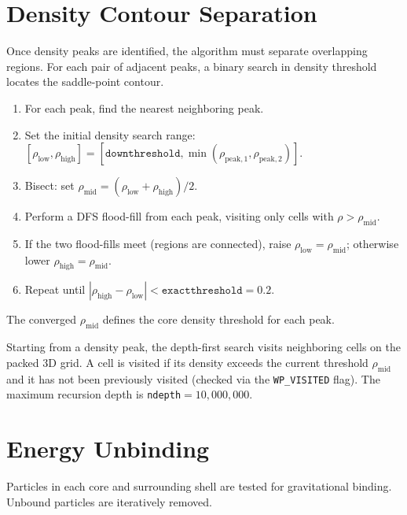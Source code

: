 \documentclass[11pt,fleqn]{book}
\newcommand{\code}[1]{\texttt{#1}}
\begin{document}
\section{Density Contour Separation}

Once density peaks are identified, the algorithm must separate overlapping regions.  For each pair of adjacent peaks, a binary search in density threshold locates the saddle-point contour.

\begin{algorithm}
\begin{enumerate}[leftmargin=2em]
  \item For each peak, find the nearest neighboring peak.
  \item Set the initial density search range: $[\rho_\text{low}, \rho_\text{high}] = [\code{downthreshold}, \min(\rho_{\text{peak},1}, \rho_{\text{peak},2})]$.
  \item Bisect: set $\rho_\text{mid} = (\rho_\text{low} + \rho_\text{high})/2$.
  \item Perform a DFS flood-fill from each peak, visiting only cells with $\rho > \rho_\text{mid}$.
  \item If the two flood-fills meet (regions are connected), raise $\rho_\text{low} = \rho_\text{mid}$; otherwise lower $\rho_\text{high} = \rho_\text{mid}$.
  \item Repeat until $|\rho_\text{high} - \rho_\text{low}| < \code{exactthreshold} = 0.2$.
\end{enumerate}
The converged $\rho_\text{mid}$ defines the core density threshold for each peak.
\end{algorithm}

\begin{definition}
Starting from a density peak, the depth-first search visits neighboring cells on the packed 3D grid.  A cell is visited if its density exceeds the current threshold $\rho_\text{mid}$ and it has not been previously visited (checked via the \code{WP\_VISITED} flag).  The maximum recursion depth is \code{ndepth}${}=10{,}000{,}000$.
\end{definition}

\section{Energy Unbinding}

Particles in each core and surrounding shell are tested for gravitational binding.  Unbound particles are iteratively removed.
\end{document}
